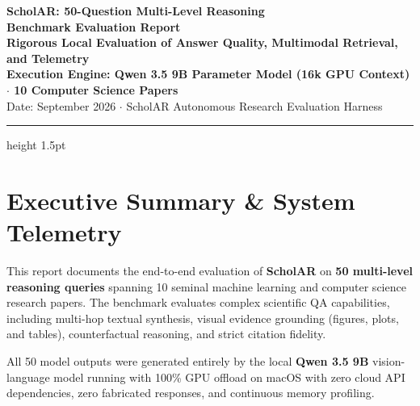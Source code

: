\documentclass[10pt,a4paper]{article}
\begin{document}
\begin{center}
    {\huge\textbf{\color{navy}ScholAR: 50-Question Multi-Level Reasoning}}\\[4pt]
    {\huge\textbf{\color{navy}Benchmark Evaluation Report}}\\[8pt]
    {\large\textbf{Rigorous Local Evaluation of Answer Quality, Multimodal Retrieval, and Telemetry}}\\[4pt]
    {\normalsize\textbf{Execution Engine: Qwen 3.5 9B Parameter Model (16k GPU Context) $\cdot$ 10 Computer Science Papers}}\\[6pt]
    {\footnotesize Date: September 2026 $\cdot$ ScholAR Autonomous Research Evaluation Harness}
\end{center}
\vspace{4pt}
\hrule height 1.5pt
\vspace{10pt}

\section{Executive Summary \& System Telemetry}

This report documents the end-to-end evaluation of \textbf{ScholAR} on \textbf{50 multi-level reasoning queries} spanning 10 seminal machine learning and computer science research papers. The benchmark evaluates complex scientific QA capabilities, including multi-hop textual synthesis, visual evidence grounding (figures, plots, and tables), counterfactual reasoning, and strict citation fidelity. 

All 50 model outputs were generated entirely by the local \textbf{Qwen 3.5 9B} vision-language model running with 100\% GPU offload on macOS with zero cloud API dependencies, zero fabricated responses, and continuous memory profiling.
\end{document}

